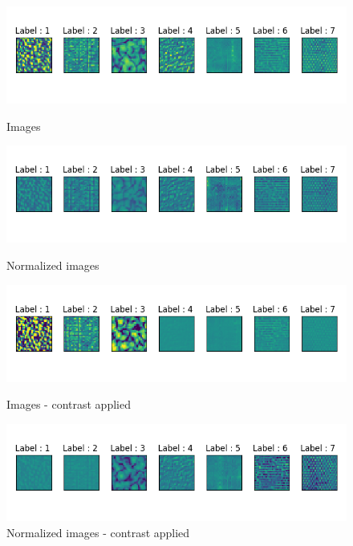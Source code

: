 \documentclass[12pt, english]{article}
\begin{document}
\begin{figure}[H] 
  \label{fig:texture-families} 
  \begin{minipage}{0.48\linewidth}
    \centering
    \includegraphics[width=.95\linewidth]{default.png} 
    \caption{Images} 
  \end{minipage}
  \begin{minipage}{0.48\linewidth}
    \centering
    \includegraphics[width=.95\linewidth]{normalized.png} 
    \caption{Normalized images} 
  \end{minipage} 
  
  
  \begin{minipage}{0.48\linewidth}
    \centering
    \includegraphics[width=.95\linewidth]{default_contrast.png} 
    \caption{Images - contrast applied} 
  \end{minipage}%
  \begin{minipage}{0.48\linewidth}
    \centering
    \includegraphics[width=.95\linewidth]{normalized_contrast.png} 
    \caption{Normalized images - contrast applied} 
  \end{minipage} 
\end{figure}
\end{document}
